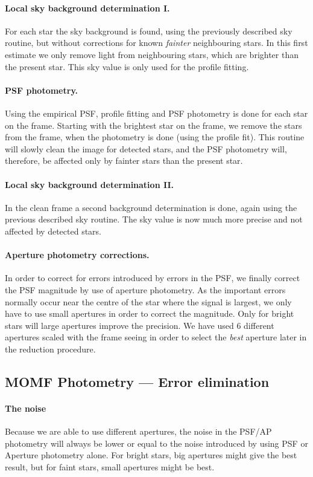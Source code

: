\documentclass[]{article}
\begin{document}
\paragraph{Local sky background determination I.}
For each star the sky background is found, using the previously 
described
sky routine, but without corrections for known {\em fainter} 
neighbouring stars.
In this first estimate we only remove light from neighbouring stars, 
which
are brighter than the present star. This
sky value is only used for the profile fitting.
\paragraph{PSF photometry.}
Using the empirical PSF, profile fitting and PSF photometry is
done for each star on the frame. Starting with the brightest star on 
the frame,
we remove the stars from the frame, when the photometry is done
(using the profile fit). This routine will slowly
clean the image for detected stars, and the PSF photometry will, 
therefore, be
affected only by fainter stars than the present star.
\paragraph{Local sky background determination II.}
In the clean frame a second background determination is done, again
using the previous described sky routine. The sky value is now much 
more
precise and not affected by detected stars.
\paragraph{Aperture photometry corrections.}
In order to correct for errors introduced by errors in the PSF, we
finally correct the PSF magnitude by use of aperture photometry.
As the important errors normally occur near the centre of the star
where the signal is largest, we only have to use small apertures
in order to correct the magnitude. Only for bright stars
will large apertures improve the precision. We have used 6 different
apertures scaled with the frame seeing in order to select the {\em 
best}
aperture later in the reduction procedure.
 
\subsection{MOMF Photometry --- Error elimination}
\paragraph{The noise}
Because we are able to use different apertures, the noise in the
PSF/AP photometry will always be lower or equal to the noise
introduced by using PSF or Aperture photometry alone. For bright
stars, big apertures might give the best result, but for faint stars,
small apertures might be best.
\end{document}
